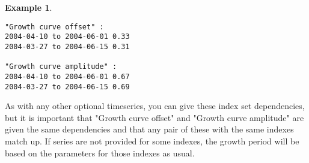 \documentclass[11pt]{article}
\theoremstyle{definition}
\newtheorem{myexample}{Example}
\newenvironment{example}%
  {\begin{lrbox}{\examplebox}%
   \begin{minipage}{\dimexpr\linewidth-2\fboxsep}
   \begin{myexample}}%
  {\end{myexample}%
   \end{minipage}%
   \end{lrbox}%
   \begin{trivlist}
     \item[]\colorbox{silver}{\usebox\examplebox}
   \end{trivlist}}
\begin{document}
\begin{example}
\begin{lstlisting}
"Growth curve offset" :
2004-04-10 to 2004-06-01 0.33
2004-03-27 to 2004-06-15 0.31

"Growth curve amplitude" :
2004-04-10 to 2004-06-01 0.67
2004-03-27 to 2004-06-15 0.69
\end{lstlisting}
\end{example}

As with any other optional timeseries, you can give these index set dependencies, but it is important that "Growth curve offset" and "Growth curve amplitude" are given the same dependencies and that any pair of these with the same indexes match up. If series are not provided for some indexes, the growth period will be based on the parameters for those indexes as usual.



\end{document}

